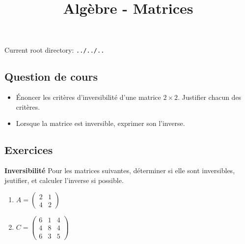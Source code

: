 \documentclass[10pt,a4paper]{article}
\title{Algèbre - Matrices}
\author{}
\date{}
\providecommand{\rootpath}{../../..}
\begin{document}
\maketitle
Current root directory: \texttt{\rootpath}

\subsection*{Question de cours}
\begin{itemize}
    \item Énoncer les critères d'inversibilité d'une matrice $2 \times 2$. Justifier chacun des critères.
    \item Lorsque la matrice est inversible, exprimer son l'inverse.
\end{itemize}

\bigskip

\subsection*{Exercices}

\textbf{Inversibilité}
Pour les matrices suivantes, déterminer si elle sont inversibles, jsutifier, et calculer l'inverse
si possible.
\begin{enumerate}
    \item $A = \begin{pmatrix} 2 & 1 \\ 4 & 2 \end{pmatrix}$
    \item $C = \begin{pmatrix}
        6 & 1 & 4 \\
        4 & 8 & 4 \\
        6 & 3 & 5
        \end{pmatrix}$
\end{enumerate}

\bigskip
\end{document}
